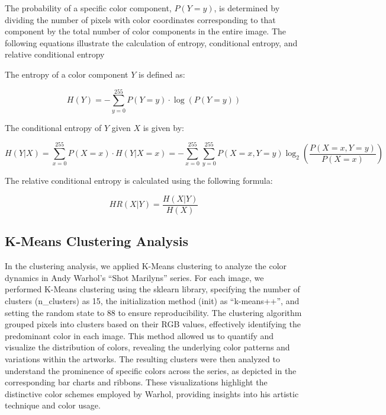 \documentclass{article}
\begin{document}
The probability of a specific color component, \(P(Y=y)\), is determined
by dividing the number of pixels with color coordinates corresponding to
that component by the total number of color components in the entire
image. The following equations illustrate the calculation of entropy,
conditional entropy, and relative conditional entropy

The entropy of a color component \(Y\) is defined as:

\begin{equation}
    H(Y) = - \sum_{y=0}^{255} P(Y = y) \cdot \log(P(Y = y))
\end{equation}

The conditional entropy of \(Y\) given \(X\) is given by:

\begin{equation}
    H(Y|X) = \sum_{x=0}^{255} P(X = x) \cdot H(Y|X = x) = - \sum_{x=0}^{255} \sum_{y=0}^{255} P(X = x, Y = y) \log_2 \left(\frac{P(X = x, Y = y)}{P(X = x)}\right)
\end{equation}

The relative conditional entropy is calculated using the following
formula:

\begin{equation}
    HR(X|Y) = \frac{H(X|Y)}{H(X)}
\end{equation}

\hypertarget{k-means-clustering-analysis}{%
\subsection{K-Means Clustering
Analysis}\label{k-means-clustering-analysis}}

In the clustering analysis, we applied K-Means clustering to analyze the
color dynamics in Andy Warhol's ``Shot Marilyns'' series. For each
image, we performed K-Means clustering using the sklearn library,
specifying the number of clusters (n\_clusters) as 15, the
initialization method (init) as ``k-means++'', and setting the random
state to 88 to ensure reproducibility. The clustering algorithm grouped
pixels into clusters based on their RGB values, effectively identifying
the predominant color in each image. This method allowed us to quantify
and visualize the distribution of colors, revealing the underlying color
patterns and variations within the artworks. The resulting clusters were
then analyzed to understand the prominence of specific colors across the
series, as depicted in the corresponding bar charts and ribbons. These
visualizations highlight the distinctive color schemes employed by
Warhol, providing insights into his artistic technique and color usage.
\end{document}
